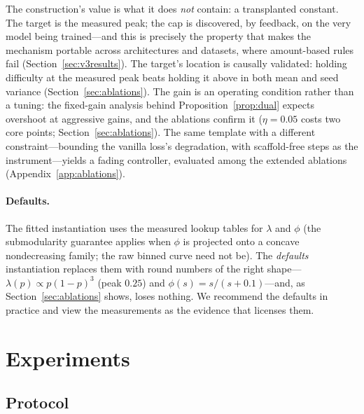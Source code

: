 \documentclass{article} %
\begin{document}
The construction's value is what it does \emph{not} contain: a transplanted constant. The target is the measured peak; the cap is discovered, by feedback, on the very model being trained---and this is precisely the property that makes the mechanism portable across architectures and datasets, where amount-based rules fail (Section~\ref{sec:v3results}). The target's location is causally validated: holding difficulty at the measured peak beats holding it above in both mean and seed variance (Section~\ref{sec:ablations}). The gain is an operating condition rather than a tuning: the fixed-gain analysis behind Proposition~\ref{prop:dual} expects overshoot at aggressive gains, and the ablations confirm it ($\eta{=}0.05$ costs two core points; Section~\ref{sec:ablations}). The same template with a different constraint---bounding the vanilla loss's degradation, with scaffold-free steps as the instrument---yields a fading controller, evaluated among the extended ablations (Appendix~\ref{app:ablations}).

\paragraph{Defaults.} The fitted instantiation uses the measured lookup tables for $\lambda$ and $\phi$ (the submodularity guarantee applies when $\phi$ is projected onto a concave nondecreasing family; the raw binned curve need not be). The \emph{defaults} instantiation replaces them with round numbers of the right shape---$\lambda(p) \propto p(1-p)^3$ (peak $0.25$) and $\phi(s) = s/(s+0.1)$---and, as Section~\ref{sec:ablations} shows, loses nothing. We recommend the defaults in practice and view the measurements as the evidence that licenses them.

\section{Experiments}
\label{sec:experiments}

\subsection{Protocol}
\end{document}
